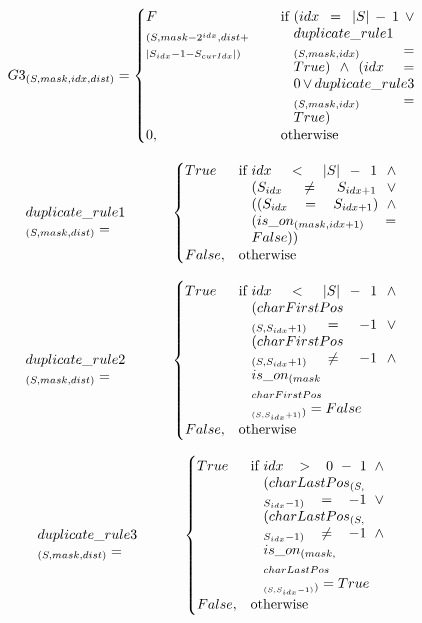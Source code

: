 \documentclass[a4paper]{IEEEtran}
\begin{document}
\begin{equation*}
G3_{(S,mask,idx, dist)}= 
\begin{cases}
\parbox[t]{0.25\linewidth}{$ F\\_{(S, mask - 2^{idx}, dist +}\\_{|S_{idx}-1 - S_{curIdx}|)} $}& \text{if } \parbox[t]{0.25\linewidth}{($idx=|S|-1 \vee duplicate\_rule1\\_{(S, mask, idx)} = True) \wedge (idx=0 \vee duplicate\_rule3\\_{(S, mask, idx)} = True)$}\\
0,& \text{otherwise}
\end{cases}
\end{equation*}

\begin{equation*}
\parbox[t]{0.3\linewidth}{$ duplicate\_rule1\\_{(S,mask,dist)}=  $}
\begin{cases}
True& \text{if } \parbox[t]{0.3\linewidth}{$idx < |S| -1 \wedge (S_{idx} \neq S_{idx + 1}  \vee ((S_{idx} = S_{idx + 1})  \wedge (is\_on_{(mask, idx + 1)} =  False$))}\\
False,& \text{otherwise}
\end{cases}
\end{equation*}

\begin{equation*}
\parbox[t]{0.3\linewidth}{$ duplicate\_rule2\\_{(S,mask,dist)}=  $}
\begin{cases}
True& \text{if } \parbox[t]{0.3\linewidth}{$idx < |S| -1
	\wedge (charFirstPos\\_{(S, S_{idx} + 1)} = -1
	\vee (charFirstPos\\_{(S, S_{idx} + 1)} \neq -1 
	\wedge is\_on_{(mask}\\_{charFirstPos}\\_{_{(S, S_{idx} + 1)})} = False$}\\
False,& \text{otherwise}
\end{cases}
\end{equation*}

\begin{equation*}
\parbox[t]{0.3\linewidth}{$ duplicate\_rule3\\_{(S,mask,dist)}=  $}
\begin{cases}
True& \text{if } \parbox[t]{0.25\linewidth}{$idx > 0 -1
	\wedge (charLastPos_{(S,}\\_{S_{idx} - 1)} = -1
	\vee (charLastPos_{(S, }\\_{S_{idx} - 1)} \neq -1 
	\wedge is\_on_{(mask,}\\_{ charLastPos}\\_{_{(S, S_{idx} - 1)})}=True$}\\
False,& \text{otherwise}
\end{cases}
\end{equation*}
\end{document}
